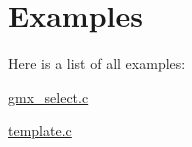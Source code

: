 \section{\-Examples}
\-Here is a list of all examples\-:\begin{DoxyCompactItemize}
\item 
\hyperlink{gmx_select_8c-example}{gmx\-\_\-select.\-c}
\item 
\hyperlink{template_8c-example}{template.\-c}
\end{DoxyCompactItemize}
